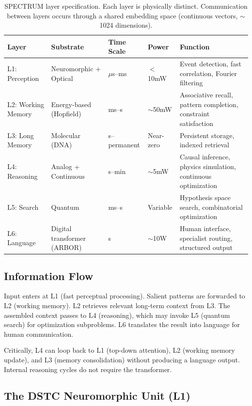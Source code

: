 \documentclass[12pt]{article}
\begin{document}
\begin{table}[H]
\centering
\small
\begin{tabular}{llllp{4cm}}
\toprule
\textbf{Layer} & \textbf{Substrate} & \textbf{Time Scale} & \textbf{Power} & \textbf{Function} \\
\midrule
L1: Perception     & Neuromorphic + Optical  & $\mu$s--ms  & $<$10mW   & Event detection, fast correlation, Fourier filtering \\
L2: Working Memory & Energy-based (Hopfield) & ms--s       & $\sim$50mW & Associative recall, pattern completion, constraint satisfaction \\
L3: Long Memory    & Molecular (DNA)         & s--permanent& Near-zero  & Persistent storage, indexed retrieval \\
L4: Reasoning      & Analog + Continuous     & s--min      & $\sim$5mW  & Causal inference, physics simulation, continuous optimization \\
L5: Search         & Quantum                 & ms--s       & Variable   & Hypothesis space search, combinatorial optimization \\
L6: Language       & Digital transformer (ARBOR) & s      & $\sim$10W  & Human interface, specialist routing, structured output \\
\bottomrule
\end{tabular}
\caption{SPECTRUM layer specification. Each layer is physically distinct. Communication between layers occurs through a shared embedding space (continuous vectors, $\sim$1024 dimensions).}
\label{tab:spectrum_layers}
\end{table}

\subsection{Information Flow}

Input enters at L1 (fast perceptual processing). Salient patterns are forwarded to L2 (working memory). L2 retrieves relevant long-term context from L3. The assembled context passes to L4 (reasoning), which may invoke L5 (quantum search) for optimization subproblems. L6 translates the result into language for human communication.

Critically, L4 can loop back to L1 (top-down attention), L2 (working memory update), and L3 (memory consolidation) without producing a language output. Internal reasoning cycles do not require the transformer.

\subsection{The DSTC Neuromorphic Unit (L1)}
\label{sec:dstc}
\end{document}
